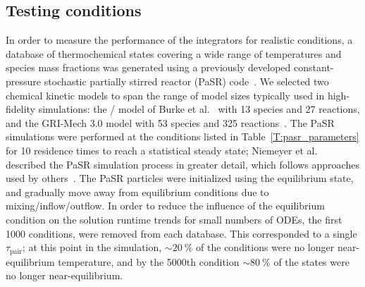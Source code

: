 \documentclass[final,twocolumn]{elsarticle}
\begin{document}
\subsection{Testing conditions}
\label{S:pasr_conditions}

In order to measure the performance of the integrators for realistic conditions, a database of thermochemical states covering a wide range of temperatures and species mass fractions was generated using a previously developed constant-pressure stochastic partially stirred reactor (PaSR) code~\cite{Niemeyer:2015ws}.
We selected two chemical kinetic models to span the range of model sizes typically used in high-fidelity simulations: the \slash{} model of Burke et al.~\cite{Burke:2011fh} with 13 species and 27 reactions, and the GRI-Mech 3.0 model with 53 species and 325 reactions~\cite{smith_gri-mech_30}.
The PaSR simulations were performed at the conditions listed in Table~\ref{T:pasr_parameters} for 10 residence times to reach a statistical steady state; Niemeyer et al.~\cite{Niemeyer:2015ws} described the PaSR simulation process in greater detail, which follows approaches used by others~\cite{Chen:1997ta,Pope:1997wu,Ren:2014cd}.
The PaSR particles were initialized using the equilibrium state, and gradually move away from equilibrium conditions due to mixing\slash inflow\slash outflow.
In order to reduce the influence of the equilibrium condition on the solution runtime trends for small numbers of ODEs, the first \num{1000} conditions, were removed from each database.
This corresponded to a single $\tau_\text{pair}$; at this point in the simulation, $\sim\SI{20}{\percent}$ of the conditions were no longer near-equilibrium temperature, and by the \num{5000}th condition $\sim\SI{80}{\percent}$ of the states were no longer near-equilibrium.

%
\end{document}
